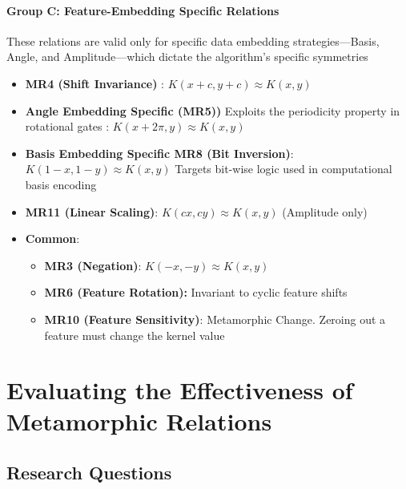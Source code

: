 \documentclass[12pt,a4paper]{article}
\begin{document}
	\paragraph{Group C: Feature-Embedding Specific Relations}
	These relations are valid only for specific data embedding strategies—Basis, Angle, and Amplitude—which dictate the algorithm's specific symmetries \cite{zaman2025surveyquantummachinelearning, schuld2018}
	\begin{itemize}
		
		\item \textbf{MR4 (Shift Invariance)} \cite{havlicek2019}:  $K(x+c, y+c) \approx K(x,y)$ 
		
		\item \textbf{Angle Embedding Specific (MR5))} Exploits the periodicity property in rotational gates \cite{Sweke2020, havlicek2019}: $K(x+2\pi, y) \approx K(x,y)$
		
		\item \textbf{Basis Embedding Specific MR8 (Bit Inversion)}: $K(1-x, 1-y) \approx K(x,y)$ Targets bit-wise logic used in computational basis encoding \cite{Dwarakanath2018}
		
		\item \textbf{MR11 (Linear Scaling)}: $K(cx, cy) \approx K(x,y)$ (Amplitude only) \cite{mottonen2004}
		
		\item \textbf{Common}:
		\begin{itemize}
			\item \textbf{MR3 (Negation)}: $K(-x,-y) \approx K(x,y)$ \cite{xie2011}
			
			\item \textbf{MR6 (Feature Rotation):} Invariant to cyclic feature shifts \cite{LaRose2020}
			
			\item \textbf{MR10 (Feature Sensitivity)}: Metamorphic Change. Zeroing out a feature must change the kernel value \cite{Segura2016}
			
		\end{itemize}
	\end{itemize}
	
	
	\section{Evaluating the Effectiveness of Metamorphic Relations}
	\label{sec:evaluation}
	
	\subsection{Research Questions}
	
\end{document}
